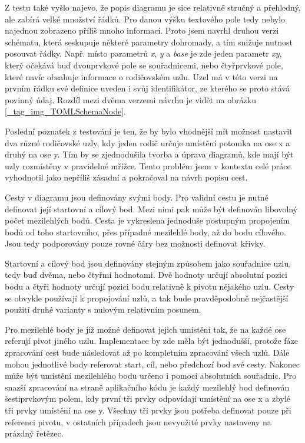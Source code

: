 \documentclass[FM,DP]{tulthesis}
\begin{document}
	Z testu také vyšlo najevo, že popis diagramu je sice relativně stručný a přehledný, ale zabírá velké množství řádků. Pro danou výšku textového pole tedy nebylo najednou zobrazeno příliš mnoho informací. Proto jsem navrhl druhou verzi schématu, která seskupuje některé parametry dohromady, a tím snižuje nutnost posouvat řádky. Např. místo parametrů \textit{x}, \textit{y} a \textit{base} je zde jeden parametr \textit{xy}, který očekává buď dvouprvkové pole se souřadnicemi, nebo čtyřprvkové pole, které navíc obsahuje informace o rodičovském uzlu. Uzel má v této verzi na prvním řádku své definice uveden i svůj identifikátor, ze kterého se proto stává povinný údaj. Rozdíl mezi dvěma verzemi návrhu je vidět na obrázku \ref{_tag_img_TOMLSchemaNode}.
	
	Poslední poznatek z testování je ten, že by bylo vhodnější mít možnost nastavit dva různé rodičovské uzly, kdy jeden rodič určuje umístění potomka na ose x a druhý na ose y. Tím by se zjednodušila tvorba a úprava diagramů, kde mají být uzly rozmístěny v pravidelné mřížce. Tento problém jsem v kontextu celé práce vyhodnotil jako nepříliš zásadní a pokračoval na návrh popisu cest.
	
	Cesty v diagramu jsou definovány svými body. Pro validní cestu je nutné definovat její startovní a cílový bod. Mezi nimi pak může být definován libovolný počet mezilehlých bodů. Cesta je vykreslena jednoduše postupným propojením bodů od toho startovního, přes případné mezilehlé body, až do bodu cílového. Jsou tedy podporovány pouze rovné čáry bez možnosti definovat křivky.
	
	Startovní a cílový bod jsou definovány stejným způsobem jako souřadnice uzlu, tedy buď dvěma, nebo čtyřmi hodnotami. Dvě hodnoty určují absolutní pozici bodu a čtyři hodnoty určují pozici bodu relativně k pivotu nějakého uzlu. Cesty se obvykle používají k propojování uzlů, a tak bude pravděpodobně nejčastější použití druhé varianty s nulovým relativním posunem.
	
	Pro mezilehlé body je již možné definovat jejich umístění tak, že na každé ose referují pivot jiného uzlu. Implementace by zde měla být jednodušší, protože fáze zpracování cest bude následovat až po kompletním zpracování všech uzlů. Dále mohou jednotlivé body referovat start, cíl, nebo předchozí bod své cesty. Nakonec může být umístění mezilehlého bodu určeno i pomocí absolutních souřadnic. Pro snazší zpracování na straně aplikačního kódu je každý mezilehlý bod definován šestiprvkovým polem, kdy první tři prvky odpovídají umístění na ose x a zbylé tři prvky umístění na ose y. Všechny tři prvky jsou potřeba definovat pouze při referenci pivotu, v ostatních případech jsou nevyužité prvky nastaveny na prázdný řetězec.
	
\end{document}
